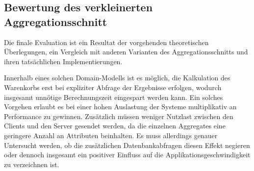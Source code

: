 

\subsection{Bewertung des verkleinerten Aggregationsschnitt}

Die finale Evaluation ist ein Resultat der vorgehenden theoretischen Überlegungen, ein Vergleich mit anderen Varianten des Aggregationsschnitts und ihren tatsächlichen Implementierungen.

Innerhalb eines solchen Domain-Modells ist es möglich, die Kalkulation des Warenkorbs erst bei expliziter Abfrage der Ergebnisse erfolgen, wodurch insgesamt unnötige Berechnungszeit eingespart werden kann. Ein solches Vorgehen erlaubt es bei einer hohen Auslastung der Systeme multiplikativ an Performance zu gewinnen. Zusätzlich müssen weniger Nutzlast zwischen den Clients und den Server gesendet werden, da die einzelnen Aggregates eine geringere Anzahl an Attributen beinhalten. Es muss allerdings genauer Untersucht werden, ob die zusätzlichen Datenbankabfragen diesen Effekt negieren oder dennoch insgesamt ein positiver Einfluss auf die Applikationsgeschwindigkeit zu verzeichnen ist. 

